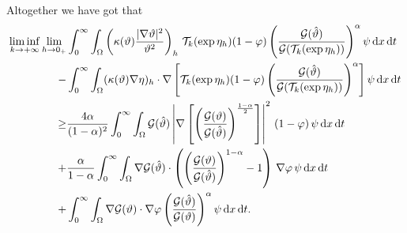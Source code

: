 \documentclass[11pt, a4paper, reqno]{amsart}
\numberwithin{equation}{section}
\newcommand{\thetah}{\hat\thet}
\newcommand{\thet}{\vartheta}
\newcommand{\dt}{\,{\rm d} t }
\newcommand{\dx}{\,{\rm d} {x}}
\newcommand{\G}{\mathcal{G}}
\newcommand{\al}{\alpha}
\newcommand{\intnO}[1]{\int_0^{\infty}\intO{ #1 }\dt}
\newcommand{\intO}[1]{\int_{\Omega} #1 \dx}
\begin{document}
Altogether we have got that
\begin{equation}
\begin{split}
  \liminf_{k\to+\infty}\lim_{h\to 0_+}
   &\intnO{\left(\kappa(\thet)\frac{|\nabla\thet|^2}{\thet^2}\right)_h\, \mathcal{T}_k(\exp{\eta_h})(1- \varphi) \left(\frac{\G(\thetah)}{\G(\mathcal{T}_k(\exp{\eta_h}))}\right)^{\al} \psi}\\
   -&\intnO{(\kappa(\thet)\nabla\eta)_h \cdot\nabla \left[ \mathcal{T}_k(\exp{\eta_h})(1-\varphi) \left(\frac{\G(\thetah)}{\G(\mathcal{T}_k(\exp{\eta_h}))}\right)^{\al} \right]\psi } \\
   \geq
   &\frac{4\al}{(1-\al)^2}\intnO{ \G(\thetah) \left|\nabla\left[\left(\frac{\G(\thet)}{\G(\thetah)}\right)^{\frac{1-\al}{2}}\right]\right|^2 \,(1-\varphi)\,\psi}\\
   +&\frac{\al}{1-\al} \intnO{  \nabla \G(\thetah) \cdot \left(\left( \frac{\G(\thet)}{\G(\thetah)}\right)^{1-\alpha}-1\right)\,\nabla\varphi\,\psi}\\
   +&\intnO{\nabla \G(\thet)\cdot \nabla\varphi  \left(\frac{\G(\thetah)}{\G(\thet)}\right)^{\al} \psi}.
\end{split}
\end{equation}
\end{document}
